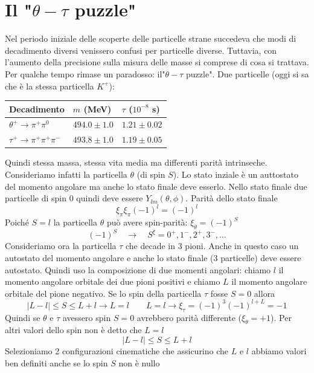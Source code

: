 \section{Il "$\theta-\tau$ puzzle"}
Nel periodo iniziale delle scoperte delle particelle strane succedeva che modi di decadimento diversi venissero confusi per particelle diverse. Tuttavia, con l'aumento della precisione sulla misura delle masse si comprese di cosa si trattava. Per qualche tempo rimase un paradosso: il"$\theta-\tau$ puzzle". Due particelle (oggi si sa che è la stessa particella $K^+$):
\begin{table}[h!]
	\centering
	\renewcommand{\arraystretch}{1.5} %
	\begin{tabular}{|l|l|l|}
		\hline
		\textbf{Decadimento} & \textbf{$m$ (MeV)} & \textbf{$\tau$ ($10^{-8}$ s)} \\ 
		\hline
		$\theta^+ \rightarrow \pi^+ \pi^0$ & $494.0 \pm 1.0$ & $1.21 \pm 0.02$ \\ 
		\hline
		$\tau^+ \rightarrow \pi^+ \pi^+ \pi^-$ & $493.8 \pm 1.0$ & $1.19 \pm 0.05$ \\ 
		\hline
	\end{tabular}
\end{table}
Quindi stessa massa, stessa vita media ma differenti parità intrinseche. Consideriamo infatti la particella $\theta$ (di spin $S$). Lo stato inziale è un auttostato del momento angolare ma anche lo stato finale deve esserlo. Nello stato finale due particelle di spin $0$ quindi deve essere $Y_{lm}(\theta,\phi)$. Parità dello stato finale 
$$
\xi_{\pi}\xi_{\pi}(-1)^l=(-1)^l
$$
Poiché $S=l$ la particella $\theta$ può avere spin-parità: $\xi_\theta=(-1)^S$ 
$$
\left(-1 \right)^S\quad\to\quad S^\xi=0^+,1^-,2^+,3^-, \dots
$$
Consideriamo ora la particella $\tau$ che decade in $3$ pioni. Anche in questo caso un autostato del momento angolare e anche lo stato finale (3 particelle) deve essere autostato. Quindi uso la composizione di due momenti angolari: chiamo $l$ il momento angolare orbitale dei due pioni positivi e chiamo $L$ il momento angolare orbitale del pione negativo. Se lo spin della particella $\tau$ fosse $S=0$ allora
$$
|L - l| \le S \le L + l \rightarrow L = l \qquad L = l \rightarrow \xi_\tau = (-1)^3 (-1)^{l+L} = -1
$$
Quindi se $\theta$ e $\tau$ avessero spin $S=0$ avrebbero parità differente ($\xi_\theta=+1$). Per altri valori dello spin non è detto che $L=l$
$$
|L-l|\le S \le L+l
$$
Selezioniamo 2 configurazioni cinematiche che assicurino che $L$ e $l$ abbiamo valori ben definiti anche se lo spin $S$ non è nullo
